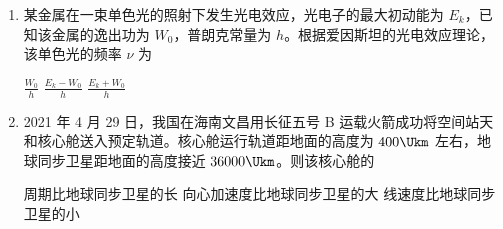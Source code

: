 \documentclass[\gkver]{gaokaozhenti}
\begin{document}
\begin{enumerate}
{	$t = \sqrt{\frac{2h}{g}} = \sqrt{\frac{2 \times 1.0}{10}}\Us = \sqrt{\frac{1}{5}}\Us$

	水平方向做匀速直线运动，则人的落水点距离滑梯末端的水平距离为

	$x = vt = 4\sqrt{5} \times \sqrt{\frac{1}{5}}\Um = 4.0\Um$

	故选 A。
}

\item
某金属在一束单色光的照射下发生光电效应，光电子的最大初动能为 $E_{k}$，已知该金属的逸出功为 $W_{0}$，普朗克常量为 $h$。根据爱因斯坦的光电效应理论，该单色光的频率 $\nu$ 为

{$\frac{W_{0}}{h}$}
{$\frac{E_{k} - W_{0}}{h}$}
{$\frac{E_{k} + W_{0}}{h}$}


\item
2021 年 4 月 29 日，我国在海南文昌用长征五号 B 运载火箭成功将空间站天和核心舱送入预定轨道。核心舱运行轨道距地面的高度为 $400\Ukm$ 左右，地球同步卫星距地面的高度接近 $36000\Ukm$。则该核心舱的

{周期比地球同步卫星的长}
{向心加速度比地球同步卫星的大}
{线速度比地球同步卫星的小}

\end{enumerate}
\end{document}

